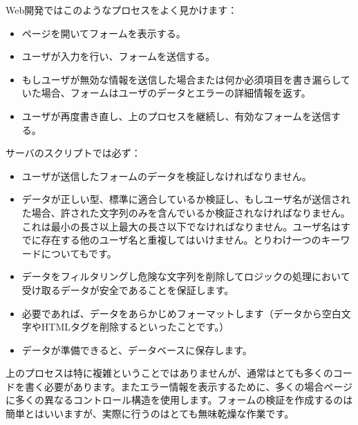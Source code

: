 Web開発ではこのようなプロセスをよく見かけます：

\begin{itemize}
  \item ページを開いてフォームを表示する。
  \item ユーザが入力を行い、フォームを送信する。
  \item もしユーザが無効な情報を送信した場合または何か必須項目を書き漏らしていた場合、フォームはユーザのデータとエラーの詳細情報を返す。
  \item ユーザが再度書き直し、上のプロセスを継続し、有効なフォームを送信する。
\end{itemize}

サーバのスクリプトでは必ず：

\begin{itemize}
  \item ユーザが送信したフォームのデータを検証しなければなりません。
  \item データが正しい型、標準に適合しているか検証し、もしユーザ名が送信された場合、許された文字列のみを含んでいるか検証されなければなりません。これは最小の長さ以上最大の長さ以下でなければなりません。ユーザ名はすでに存在する他のユーザ名と重複してはいけません。とりわけ一つのキーワードについてもです。
  \item データをフィルタリングし危険な文字列を削除してロジックの処理において受け取るデータが安全であることを保証します。
  \item 必要であれば、データをあらかじめフォーマットします（データから空白文字やHTMLタグを削除するといったことです。）
  \item データが準備できると、データベースに保存します。
\end{itemize}


上のプロセスは特に複雑ということではありませんが、通常はとても多くのコードを書く必要があります。またエラー情報を表示するために、多くの場合ページに多くの異なるコントロール構造を使用します。フォームの検証を作成するのは簡単とはいいますが、実際に行うのはとても無味乾燥な作業です。
